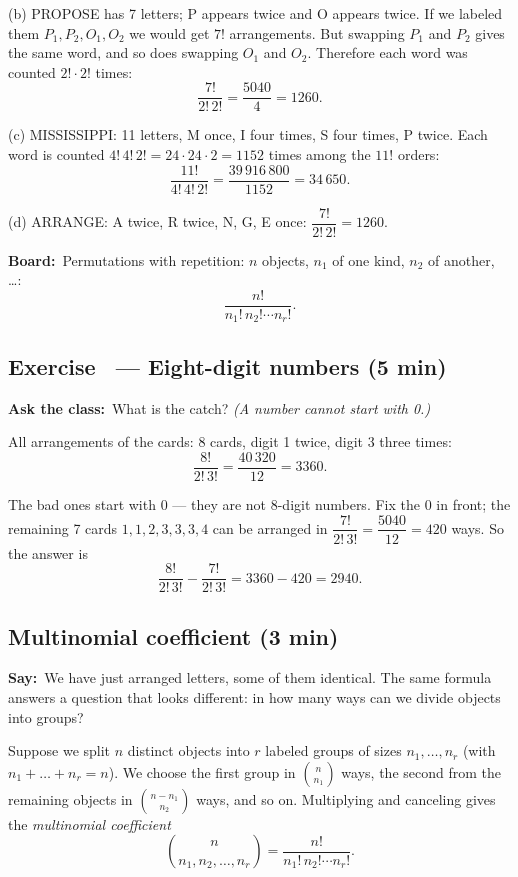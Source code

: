 \documentclass[11pt,a4paper,parskip=half]{scrartcl}
\newcommand{\say}{\textbf{\color{teal}Say:}\ }
\newcommand{\board}{\textbf{\color{gold}Board:}\ }
\newcommand{\ask}{\textbf{\color{navy}Ask the class:}\ }
\newcommand{\slide}[1]{\marginpar{\raggedright\footnotesize\color{gray}slide #1}}
\begin{document}
(b) PROPOSE has 7 letters; P appears twice and O appears twice. If we
labeled them $P_1, P_2, O_1, O_2$ we would get $7!$ arrangements. But
swapping $P_1$ and $P_2$ gives the same word, and so does swapping $O_1$ and
$O_2$. Therefore each word was counted $2!\cdot2!$ times:
\[ \frac{7!}{2!\,2!} = \frac{5040}{4} = 1260. \]

(c) MISSISSIPPI: 11 letters, M once, I four times, S four times, P twice.
Each word is counted $4!\,4!\,2! = 24\cdot24\cdot2 = 1152$ times among the
$11!$ orders:
\[ \frac{11!}{4!\,4!\,2!} = \frac{39\,916\,800}{1152} = 34\,650. \]

(d) ARRANGE: A twice, R twice, N, G, E once: $\dfrac{7!}{2!\,2!} = 1260$.

\board Permutations with repetition: $n$ objects, $n_1$ of one kind, $n_2$
of another, \ldots:
\[ \frac{n!}{n_1!\,n_2!\cdots n_r!}. \]

\subsection{Exercise~ --- Eight-digit numbers (5 min)}\slide{9}


\ask What is the catch? \emph{(A number cannot start with 0.)}

All arrangements of the cards: 8 cards, digit 1 twice, digit 3 three times:
\[ \frac{8!}{2!\,3!} = \frac{40\,320}{12} = 3360. \]

The bad ones start with 0 --- they are not 8-digit numbers. Fix the 0 in
front; the remaining 7 cards $1,1,2,3,3,3,4$ can be arranged in
$\dfrac{7!}{2!\,3!} = \dfrac{5040}{12} = 420$ ways. So the answer is
\[ \frac{8!}{2!\,3!}-\frac{7!}{2!\,3!} = 3360 - 420 = 2940. \]

\subsection{Multinomial coefficient (3 min)}\slide{10}

\say We have just arranged letters, some of them identical. The same formula
answers a question that looks different: in how many ways can we divide
objects into groups?

Suppose we split $n$ distinct objects into $r$ labeled groups of sizes
$n_1,\dots,n_r$ (with $n_1+\dots+n_r=n$). We choose the first group in
$\binom{n}{n_1}$ ways, the second from the remaining objects in
$\binom{n-n_1}{n_2}$ ways, and so on. Multiplying and canceling gives the
\emph{multinomial coefficient}
\[ \binom{n}{n_1,n_2,\dots,n_r} = \frac{n!}{n_1!\,n_2!\cdots n_r!}. \]
\end{document}
